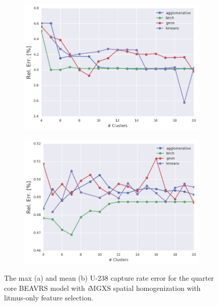\begin{figure}[h!]
\centering
\begin{subfigure}{0.9\textwidth}
  \centering
  \includegraphics[width=\linewidth]{figures/results/err-by-cluster/full-core/max-rel-err}
  \caption{}
  \label{fig:max-capt-err-by-cluster-assm-full-core}
\end{subfigure}
\begin{subfigure}{0.9\textwidth}
  \centering
  \includegraphics[width=\linewidth]{figures/results/err-by-cluster/full-core/mean-rel-err}
  \caption{}
  \label{fig:mean-capt-err-by-cluster-assm-full-core}
\end{subfigure}
\caption[U-238 capture rate errors for quarter core BEAVRS model]{The max (a) and mean (b) U-238 capture rate error for the quarter core \ac{BEAVRS} model with \textit{i}\ac{MGXS} spatial homogenization with litmus-only feature selection.}
\label{fig:capt-err-by-cluster-assm-full-core}
\end{figure}

